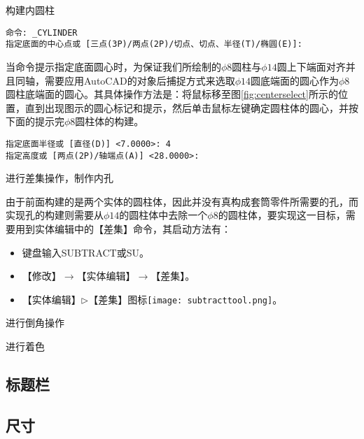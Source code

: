 \begin{procedure}
\item 构建内圆柱
\begin{lstlisting}
命令: _CYLINDER
指定底面的中心点或 [三点(3P)/两点(2P)/切点、切点、半径(T)/椭圆(E)]:
\end{lstlisting}
当命令提示指定底面圆心时，为保证我们所绘制的$\phi 8$圆柱与$\phi 14$圆上下端面对齐并且同轴，需要应用AutoCAD的对象后捕捉方式来选取$\phi 14$圆底端面的圆心作为$\phi 8$圆柱底端面的圆心。其具体操作方法是：将鼠标移至图\ref{fig:centerselect}所示的位置，直到出现图示的圆心标记和提示，然后单击鼠标左键确定圆柱体的圆心，并按下面的提示完$\phi 8$圆柱体的构建。
\begin{lstlisting}
指定底面半径或 [直径(D)] <7.0000>: 4
指定高度或 [两点(2P)/轴端点(A)] <28.0000>:
\end{lstlisting}
\item 进行差集操作，制作内孔

由于前面构建的是两个实体的圆柱体，因此并没有真构成套筒零件所需要的孔，而实现孔的构建则需要从$\phi 14$的圆柱体中去除一个$\phi 8$的圆柱体，要实现这一目标，需要用到实体编辑中的【差集】命令，其启动方法有：
\begin{itemize}
\item 键盘输入SUBTRACT或SU。
\item 【修改】$\rightarrow$【实体编辑】$\rightarrow$【差集】。
\item 【实体编辑】$\triangleright$【差集】图标\texttt{[image: subtracttool.png]}。
\end{itemize}
\item 进行倒角操作
\item 进行着色
\end{procedure}
\subsection{标题栏}
\subsection{尺寸}

\endinput